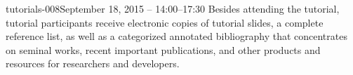 \begin{tutorial}{tutorials-008}{September 18, 2015 -- 14:00--17:30}
Besides attending the tutorial, tutorial participants receive electronic
copies of tutorial slides, a complete reference list, as well as a
categorized annotated bibliography that concentrates on seminal works,
recent important publications, and other products and resources for
researchers and developers.

\end{tutorial} 
